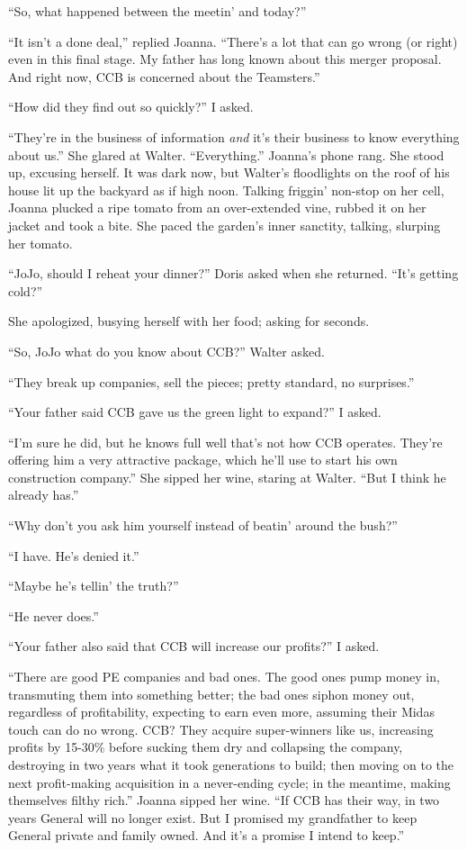 ``So, what happened between the meetin' and today?''

``It isn't a done deal,'' replied Joanna. ``There's a lot that can go
wrong (or right) even in this final stage. My father has long known
about this merger proposal. And right now, CCB is concerned about the
Teamsters.''

``How did they find out so quickly?'' I asked.

``They're in the business of information \emph{and} it's their business
to know everything about us.'' She glared at Walter. ``Everything.''
Joanna's phone rang. She stood up, excusing herself. It was dark now,
but Walter's floodlights on the roof of his house lit up the backyard as
if high noon. Talking friggin' non-stop on her cell, Joanna plucked a
ripe tomato from an over-extended vine, rubbed it on her jacket and took
a bite. She paced the garden's inner sanctity, talking, slurping her
tomato.

``JoJo, should I reheat your dinner?'' Doris asked when she returned.
``It's getting cold?''

She apologized, busying herself with her food; asking for seconds.

``So, JoJo what do you know about CCB?'' Walter asked.

``They break up companies, sell the pieces; pretty standard, no
surprises.''

``Your father said CCB gave us the green light to expand?'' I asked.

``I'm sure he did, but he knows full well that's not how CCB operates.
They're offering him a very attractive package, which he'll use to start
his own construction company.'' She sipped her wine, staring at Walter.
``But I think he already has.''

``Why don't you ask him yourself instead of beatin' around the bush?''

``I have. He's denied it.''

``Maybe he's tellin' the truth?''

``He never does.''

``Your father also said that CCB will increase our profits?'' I asked.

``There are good PE companies and bad ones. The good ones pump money in,
transmuting them into something better; the bad ones siphon money out,
regardless of profitability, expecting to earn even more, assuming their
Midas touch can do no wrong. CCB? They acquire super-winners like us,
increasing profits by 15-30\% before sucking them dry and collapsing the
company, destroying in two years what it took generations to build; then
moving on to the next profit-making acquisition in a never-ending cycle;
in the meantime, making themselves filthy rich.'' Joanna sipped her
wine. ``If CCB has their way, in two years General will no longer exist.
But I promised my grandfather to keep General private and family owned.
And it's a promise I intend to keep.''

